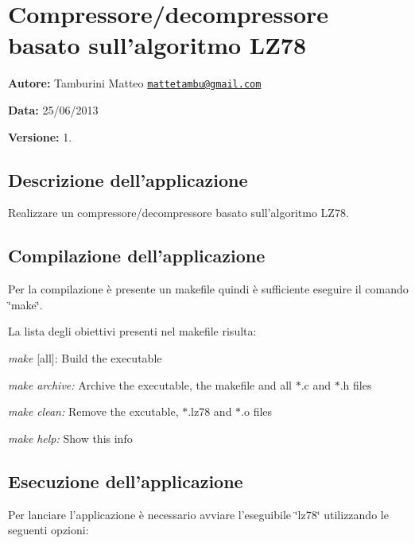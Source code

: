 \hypertarget{index_LZ78_Compression}{}\section{Compressore/decompressore basato sull'algoritmo L\-Z78}\label{index_LZ78_Compression}
{\bfseries Autore\-:} Tamburini Matteo \href{mailto:mattetambu@gmail.com}{\tt mattetambu@gmail.\-com} \par
 {\bfseries Data\-:} 25/06/2013 \par
 {\bfseries Versione\-:} 1. \par
 \par
\hypertarget{index_Descrizione}{}\subsection{Descrizione dell'applicazione}\label{index_Descrizione}
Realizzare un compressore/decompressore basato sull'algoritmo L\-Z78. \par
 \par
\hypertarget{index_Compilazione}{}\subsection{Compilazione dell'applicazione}\label{index_Compilazione}
Per la compilazione è presente un makefile quindi è sufficiente eseguire il comando \char`\"{}make\char`\"{}. \par
 La lista degli obiettivi presenti nel makefile risulta\-:
\begin{DoxyItemize}
\item {\itshape make} {\itshape }\mbox{[}all\mbox{]}\-: Build the executable
\item {\itshape make} {\itshape archive\-:} Archive the executable, the makefile and all $\ast$.c and $\ast$.h files
\item {\itshape make} {\itshape clean\-:} Remove the excutable, $\ast$.lz78 and $\ast$.o files
\item {\itshape make} {\itshape help\-:} Show this info \par
 \par

\end{DoxyItemize}\hypertarget{index_Esecuzione}{}\subsection{Esecuzione dell'applicazione}\label{index_Esecuzione}
Per lanciare l'applicazione è necessario avviare l'eseguibile \char`\"{}lz78\char`\"{} utilizzando le seguenti opzioni\-:
